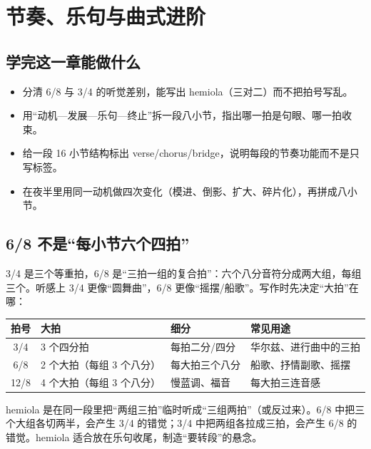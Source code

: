 \clearpage
\chapter{节奏、乐句与曲式进阶}
\label{chap:rhythm-phrase-form}


\section*{学完这一章能做什么}
\begin{itemize}
  \item 分清 6/8 与 3/4 的听觉差别，能写出 hemiola（三对二）而不把拍号写乱。
  \item 用“动机—发展—乐句—终止”拆一段八小节，指出哪一拍是句眼、哪一拍收束。
  \item 给一段 16 小节结构标出 verse/chorus/bridge，说明每段的节奏功能而不是只写标签。
  \item 在夜半里用同一动机做四次变化（模进、倒影、扩大、碎片化），再拼成八小节。
\end{itemize}

\section{6/8 不是“每小节六个四拍”}

3/4 是三个等重拍，6/8 是“三拍一组的复合拍”：六个八分音符分成两大组，每组三个。听感上 3/4 更像“圆舞曲”，6/8 更像“摇摆/船歌”。写作时先决定“大拍”在哪：

\begin{center}
\small
\begin{tabular}{clll}
\toprule
拍号 & 大拍 & 细分 & 常见用途 \\
\midrule
3/4 & 3 个四分拍 & 每拍二分/四分 & 华尔兹、进行曲中的三拍 \\
6/8 & 2 个大拍（每组 3 个八分） & 每大拍三个八分 & 船歌、抒情副歌、摇摆 \\
12/8 & 4 个大拍（每组 3 个八分） & 慢蓝调、福音 & 每大拍三连音感 \\
\bottomrule
\end{tabular}
\end{center}

hemiola 是在同一段里把“两组三拍”临时听成“三组两拍”（或反过来）。6/8 中把三个大组各切两半，会产生 3/4 的错觉；3/4 中把两组各拉成三拍，会产生 6/8 的错觉。hemiola 适合放在乐句收尾，制造“要转段”的悬念。

